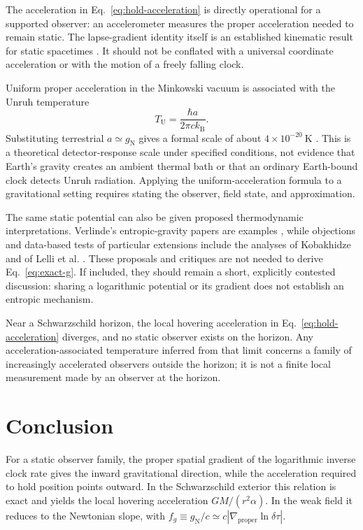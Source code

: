 \documentclass[12pt]{article}
\begin{document}
The acceleration in Eq.~\eqref{eq:hold-acceleration} is directly operational for a supported observer: an accelerometer measures the proper acceleration needed to remain static. The lapse-gradient identity itself is an established kinematic result for static spacetimes \cite{SantiagoVisser}. It should not be conflated with a universal coordinate acceleration or with the motion of a freely falling clock.

Uniform proper acceleration in the Minkowski vacuum is associated with the Unruh temperature
\begin{equation}
  T_{\mathrm{U}}=\frac{\hbar a}{2\pi c k_{\mathrm{B}}}.
  \label{eq:unruh}
\end{equation}
Substituting terrestrial $a\simeq g_{\mathrm{N}}$ gives a formal scale of about $4\times10^{-20}\ \mathrm{K}$ \cite{Unruh}. This is a theoretical detector-response scale under specified conditions, not evidence that Earth's gravity creates an ambient thermal bath or that an ordinary Earth-bound clock detects Unruh radiation. Applying the uniform-acceleration formula to a gravitational setting requires stating the observer, field state, and approximation.

The same static potential can also be given proposed thermodynamic interpretations. Verlinde's entropic-gravity papers are examples \cite{Verlinde2011,Verlinde2017}, while objections and data-based tests of particular extensions include the analyses of Kobakhidze and of Lelli et al. \cite{Kobakhidze,Lelli}. These proposals and critiques are not needed to derive Eq.~\eqref{eq:exact-g}. If included, they should remain a short, explicitly contested discussion: sharing a logarithmic potential or its gradient does not establish an entropic mechanism.

Near a Schwarzschild horizon, the local hovering acceleration in Eq.~\eqref{eq:hold-acceleration} diverges, and no static observer exists on the horizon. Any acceleration-associated temperature inferred from that limit concerns a family of increasingly accelerated observers outside the horizon; it is not a finite local measurement made by an observer at the horizon.

\section{Conclusion}

For a static observer family, the proper spatial gradient of the logarithmic inverse clock rate gives the inward gravitational direction, while the acceleration required to hold position points outward. In the Schwarzschild exterior this relation is exact and yields the local hovering acceleration $GM/(r^2\alpha)$. In the weak field it reduces to the Newtonian slope, with $f_g\equiv g_{\mathrm{N}}/c\simeq c|\nabla_{\mathrm{proper}}\ln\delta\tau|$.
\end{document}
